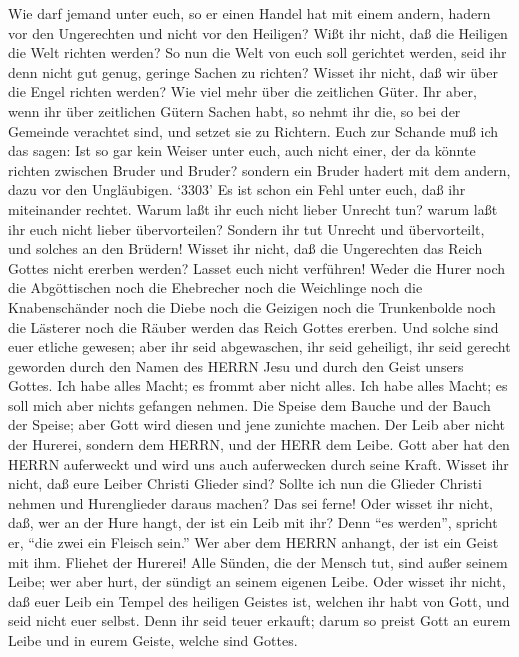  Wie darf jemand unter euch, so er einen Handel hat mit
einem andern, hadern vor den Ungerechten und nicht vor den Heiligen?
 Wißt ihr nicht, daß die Heiligen die Welt richten werden?
So nun die Welt von euch soll gerichtet werden, seid ihr denn nicht gut
genug, geringe Sachen zu richten?  Wisset ihr nicht, daß wir
über die Engel richten werden? Wie viel mehr über die zeitlichen Güter.
 Ihr aber, wenn ihr über zeitlichen Gütern Sachen habt, so
nehmt ihr die, so bei der Gemeinde verachtet sind, und setzet sie zu
Richtern.  Euch zur Schande muß ich das sagen: Ist so gar
kein Weiser unter euch, auch nicht einer, der da könnte richten zwischen
Bruder und Bruder?  sondern ein Bruder hadert mit dem
andern, dazu vor den Ungläubigen.  `3303' Es ist schon ein
Fehl unter euch, daß ihr miteinander rechtet. Warum laßt ihr euch nicht
lieber Unrecht tun? warum laßt ihr euch nicht lieber übervorteilen?
 Sondern ihr tut Unrecht und übervorteilt, und solches an
den Brüdern!  Wisset ihr nicht, daß die Ungerechten das
Reich Gottes nicht ererben werden? Lasset euch nicht verführen! Weder
die Hurer noch die Abgöttischen noch die Ehebrecher noch die Weichlinge
noch die Knabenschänder  noch die Diebe noch die Geizigen
noch die Trunkenbolde noch die Lästerer noch die Räuber werden das Reich
Gottes ererben.  Und solche sind euer etliche gewesen; aber
ihr seid abgewaschen, ihr seid geheiligt, ihr seid gerecht geworden
durch den Namen des HERRN Jesu und durch den Geist unsers Gottes.
 Ich habe alles Macht; es frommt aber nicht alles. Ich habe
alles Macht; es soll mich aber nichts gefangen nehmen.  Die
Speise dem Bauche und der Bauch der Speise; aber Gott wird diesen und
jene zunichte machen. Der Leib aber nicht der Hurerei, sondern dem
HERRN, und der HERR dem Leibe.  Gott aber hat den HERRN
auferweckt und wird uns auch auferwecken durch seine Kraft.
 Wisset ihr nicht, daß eure Leiber Christi Glieder sind?
Sollte ich nun die Glieder Christi nehmen und Hurenglieder daraus
machen? Das sei ferne!  Oder wisset ihr nicht, daß, wer an
der Hure hangt, der ist ein Leib mit ihr? Denn ``es werden'', spricht
er, ``die zwei ein Fleisch sein.''  Wer aber dem HERRN
anhangt, der ist ein Geist mit ihm.  Fliehet der Hurerei!
Alle Sünden, die der Mensch tut, sind außer seinem Leibe; wer aber hurt,
der sündigt an seinem eigenen Leibe.  Oder wisset ihr
nicht, daß euer Leib ein Tempel des heiligen Geistes ist, welchen ihr
habt von Gott, und seid nicht euer selbst.  Denn ihr seid
teuer erkauft; darum so preist Gott an eurem Leibe und in eurem Geiste,
welche sind Gottes.

